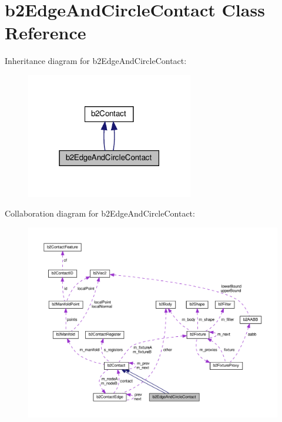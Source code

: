 \hypertarget{classb2EdgeAndCircleContact}{}\section{b2\+Edge\+And\+Circle\+Contact Class Reference}
\label{classb2EdgeAndCircleContact}


Inheritance diagram for b2\+Edge\+And\+Circle\+Contact\+:
\nopagebreak
\begin{figure}[H]
\begin{center}
\leavevmode
\includegraphics[width=207pt]{classb2EdgeAndCircleContact__inherit__graph}
\end{center}
\end{figure}


Collaboration diagram for b2\+Edge\+And\+Circle\+Contact\+:
\nopagebreak
\begin{figure}[H]
\begin{center}
\leavevmode
\includegraphics[width=350pt]{classb2EdgeAndCircleContact__coll__graph}
\end{center}
\end{figure}
